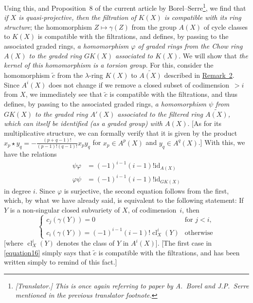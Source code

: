 \documentclass{article}
\theoremstyle{plain}
\theoremstyle{definition}
\DeclareMathOperator{\cl}{cl}
\newcommand{\oldpage}[1]{\marginpar{\footnotesize$\Big\vert$ \textit{p.~#1}}}
\begin{document}
\begin{enumerate}
    \renewcommand*{\thefootnote}{*}
    Using this, and Proposition~8 of the current article by Borel--Serre\footnote{\emph{[Translator.] This is once again referring to paper by A.~Borel and J.P.~Serre mentioned in the previous translator footnote.}}, we find that \emph{if $X$ is quasi-projective, then the filtration of $K(X)$ is compatible with its ring structure};
    the homomorphism $Z\mapsto\gamma(Z)$ from the group $A(X)$ of cycle classes to $K(X)$ is compatible with the filtrations, and defines, by passing to the associated graded rings, \emph{a homomorphism $\varphi$ of graded rings from the Chow ring $A(X)$ to the graded ring $GK(X)$ associated to $K(X)$}.
    We will show that \emph{the kernel of this homomorphism is a torsion group}.
    For this, consider the homomorphism $\widetilde{c}$ from the $\lambda$-ring $K(X)$ to $\widetilde{A(X)}$ described in \hyperref[remark2]{Remark~2}.
    Since $A^i(X)$ does not change if we remove a closed subset of codimension~$>i$ from $X$, we immediately see that $\widetilde{c}$ is compatible with the filtrations, and thus defines, by passing to the associated graded rings, \emph{a homomorphism $\psi$ from $GK(X)$ to the graded ring $A'(X)$ associated to the filtered ring $\widetilde{A(X)}$, which can itself be identified (as a graded group) with $A(X)$}.
    [As for its multiplicative structure, we can formally verify that it is given by the product $x_p\star y_q = -\frac{(p+q-1)!}{(p-1)!(q-1)!}x_p y_q$ for $x_p\in A^p(X)$ and $y_q\in A^q(X)$.]
    With this, we have the relations
    \[
    \label{equation15}
      \begin{aligned}
        \psi\varphi &= (-1)^{i-1}(i-1)!\mathrm{id}_{A(X)}
      \\\varphi\psi &= (-1)^{i-1}(i-1)!\mathrm{id}_{GK(X)}
      \end{aligned}
    \tag{15}
    \]
    in degree $i$.
    Since $\varphi$ is surjective, the second equation follows from the first, which, by what we have already said, is equivalent to the following statement:
    If $Y$
\oldpage{151}
    is a non-singular closed subvariety of $X$, of codimension~$i$, then
    \[
    \label{equation16}
      \begin{cases}
        c_j(\gamma(Y)) = 0 &\mbox{for $j<i$},
      \\c_i(\gamma(Y)) = (-1)^{i-1}(i-1)!\cl_X^i(Y) &\mbox{otherwise}
      \end{cases}
    \tag{16}
    \]
    [where $\cl_X^i(Y)$ denotes the class of $Y$ in $A^i(X)$].
    [The first case in \cref{equation16} simply says that $\widetilde{c}$ is compatible with the filtrations, and has been written simply to remind of this fact.]

\end{enumerate}
\end{document}
